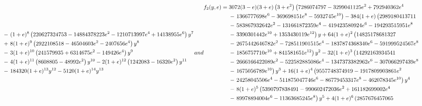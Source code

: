 \[\begin{align}
 {} & - \left. (1 + e)^8 \left(220627324753 - 14884378223 e^2 - 1210713997 e^4 + 14138955 e^6\right) y^7 \right. \nonumber \\
 {} & + \left. 8 (1 + e)^9 \left(2922108518 - 46504603 e^2 - 2407656 e^4\right) y^8 \right. \nonumber \\
 {} & - \left. 3 (1 + e)^{10} \left(241579935 + 6314675 e^2 - 149426 e^4\right) y^9 \right. \nonumber \\
 {} & - \left. 4 (1 + e)^{11} \left(8608805 - 48992 e^2\right) y^{10} - 2 (1 + e)^{12} \left(1242083 - 16320 e^2\right) y^{11} \right. \nonumber \\
 {} & - \left. 184320 (1 + e)^{13} y^{12} - 5120 (1 + e)^{14} y^{13} \right.
\end{align}
and
\begin{align}
f_2(y, e) = {} & 3072 (3 - e) (3 + e) \left(3 + e^2 \right) \left(7286074797 - 3299041125 e^2 + 792940362 e^4 \right. \nonumber \\
 {} & - \left. 1366777698 e^6 - 369698151 e^8 - 5932745 e^{10} \right) - 384 (1 + e) \left(2989180413711 \vphantom{e^0} \right. \nonumber \\
 {} & - \left. 583867932642 e^2 - 131661872359 e^4 - 419423580924 e^6 - 194293515951 e^8 \right. \nonumber \\
 {} & - \left. 3390301442 e^{10} + 1353430119 e^{12} \right) {y} + 64 (1 + e)^2 \left(14825178681327 \vphantom{e^0} \right. \nonumber \\
 {} & - \left. 2675442646782 e^2 - 728511901515 e^4 - 1837874368340 e^6 - 591999524567 e^8 \right. \nonumber \\
 {} & - \left. 1856757710 e^{10} + 841581651 e^{12}\right) y^2 - 32 (1 + e)^3 \left(14292163934541 \vphantom{e^0} \right. \nonumber \\
 {} & - \left. 2666166422089 e^2 - 522582885086 e^4 - 1347373382962 e^6 - 307066297439 e^8 \right. \nonumber \\
 {} & - \left. 1675056789 e^{10}\right) y^3 + 16 (1 + e)^4 \left(9557748374919 - 1917809903861 e^2 \right. \nonumber \\
 {} & - \left. 24258045506 e^4 - 511875047746 e^6 - 86779453317 e^8 - 462078345 e^{10}\right) y^4 \nonumber \\
 {} & - \left. 8 (1 + e)^5 \left(5390797838491 - 990602472036 e^2 + 161182699002 e^4 \right.\right. \nonumber \\
 {} & - \left. 89978894004 e^6 - 11363685245 e^8\right) y^5 + 4 (1 + e)^6 \left(2857676457065 \right. \nonumber \\

\end{align}\]
